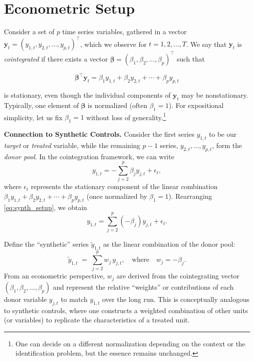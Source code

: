 \section{Econometric Setup}

Consider a set of $p$ time series variables, gathered in a vector $\mathbf{y}_t = (y_{1,t}, y_{2,t}, \ldots, y_{p,t})^\top$, which we observe for $t = 1, 2, \ldots, T$. We say that $\mathbf{y}_t$ is \textit{cointegrated} if there exists a vector $\boldsymbol{\beta} = (\beta_1, \beta_2, \ldots, \beta_p)^\top$ such that

\begin{equation}
    \boldsymbol{\beta}^\top \mathbf{y}_t 
    = \beta_1 y_{1,t} + \beta_2 y_{2,t} + \cdots + \beta_p y_{p,t}
\end{equation}

is stationary, even though the individual components of $\mathbf{y}_t$ may be nonstationary. Typically, one element of $\boldsymbol{\beta}$ is normalized (often $\beta_1 = 1$). For expositional simplicity, let us fix $\beta_1 = 1$ without loss of generality.\footnote{One can decide on a different normalization depending on the context or the identification problem, but the essence remains unchanged.}


\vspace{1em}
\noindent
\textbf{Connection to Synthetic Controls.}
Consider the first series $y_{1,t}$ to be our \textit{target} or \textit{treated} variable, while the remaining $p-1$ series, $y_{2,t}, \dots, y_{p,t}$, form the \textit{donor pool}. In the cointegration framework, we can write
\begin{equation}
    y_{1,t} = - \sum_{j=2}^{p} \beta_j y_{j,t} + \epsilon_t,
    \label{eq:synth_setup}
\end{equation}
where $\epsilon_t$ represents the stationary component of the linear combination $\beta_1 y_{1,t} + \beta_2 y_{2,t} + \cdots + \beta_p y_{p,t}$ (once normalized by $\beta_1 = 1$). Rearranging \eqref{eq:synth_setup}, we obtain
\begin{equation}
    y_{1,t} = \sum_{j=2}^{p} \left( -\beta_j \right) y_{j,t} + \epsilon_t.
\end{equation}


Define the ``synthetic'' series $\widetilde{y}_{1,t}$ as the linear combination of the donor pool:
\begin{equation}
    \widetilde{y}_{1,t} \;=\; \sum_{j=2}^{p} w_j \, y_{j,t},
    \quad \text{where} \quad w_j = -\beta_j.
\end{equation}
From an econometric perspective, $w_j$ are derived from the cointegrating vector $(\beta_1, \beta_2, \ldots, \beta_p)$ and represent the relative ``weights'' or contributions of each donor variable $y_{j,t}$ to match $y_{1,t}$ over the long run. This is conceptually analogous to synthetic controls, where one constructs a weighted combination of other units (or variables) to replicate the characteristics of a treated unit.

